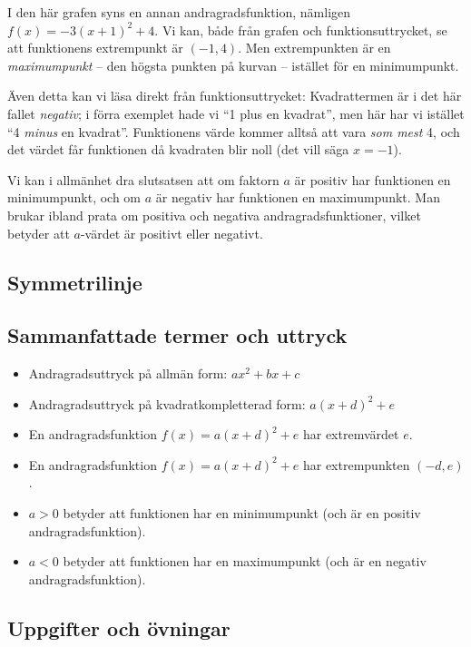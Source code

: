 I den här grafen syns en annan andragradsfunktion, nämligen $f(x)=-3(x+1)^2+4$.
Vi kan, både från grafen och funktionsuttrycket, se att funktionens extrempunkt är $(-1, 4)$.
Men extrempunkten är en \emph{maximumpunkt} -- den högsta punkten på kurvan -- istället för en minimumpunkt.

Även detta kan vi läsa direkt från funktionsuttrycket:
Kvadrattermen är i det här fallet \emph{negativ}; i förra exemplet hade vi ``1 plus en kvadrat'', men här har vi istället ``4 \emph{minus} en kvadrat''.
Funktionens värde kommer alltså att vara \emph{som mest} 4, och det värdet får funktionen då kvadraten blir noll (det vill säga $x=-1$).

Vi kan i allmänhet dra slutsatsen att om faktorn $a$ är positiv har funktionen en minimumpunkt, och om $a$ är negativ har funktionen en maximumpunkt.
Man brukar ibland prata om positiva och negativa andragradsfunktioner, vilket betyder att $a$-värdet är positivt eller negativt.

\subsection{Symmetrilinje}



\subsection{Sammanfattade termer och uttryck}

\begin{itemize}
  \item Andragradsuttryck på allmän form: $ax^2+bx+c$
  \item Andragradsuttryck på kvadratkompletterad form: $a(x+d)^2+e$
  \item En andragradsfunktion $f(x)=a(x+d)^2+e$ har extremvärdet $e$.
  \item En andragradsfunktion $f(x)=a(x+d)^2+e$ har extrempunkten $(-d, e)$.
  \item $a > 0$ betyder att funktionen har en minimumpunkt (och är en positiv andragradsfunktion).
  \item $a < 0$ betyder att funktionen har en maximumpunkt (och är en negativ andragradsfunktion).
\end{itemize}

\subsection{Uppgifter och övningar}


